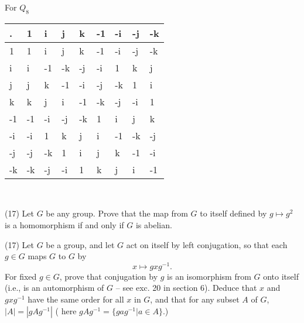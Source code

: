\documentclass[1    0pt, answers]{exam} \renewcommand{\baselinestretch}{1.05}
\theoremstyle{plain}
\theoremstyle{definition}
\begin{document}
\begin{questions}
\begin{solution}
For $Q_8$
\begin{tabular}{L||L|L|L|L|L|L|L|L||}
.  & 1  & i  & j  & k  & -1 & -i & -j & -k  \\
\hline{}  & 1  & i  & j  & k  & -1 & -i & -j & -k \\
i  & i  & -1 & -k & -j & -i & 1  & k  & j  \\
j  & j  & k  & -1 & -i & -j & -k & 1  & i  \\
k  & k  & j  & i  & -1 & -k & -j & -i & 1  \\
-1 & -1 & -i & -j & -k & 1  & i  & j  & k  \\
-i & -i & 1  & k  & j  & i  & -1 & -k & -j \\
-j & -j & -k & 1  & i  & j  & k  & -1 & -i \\
-k & -k & -j & -i & 1  & k  & j  & i  & -1 \\
\hline
\end{tabular}\\
\end{solution}

\question (17) Let $G$ be any group. Prove that the map from $G$ to itself defined by $g \mapsto g^2$ is a homomorphism if and only if $G$ is abelian.

\begin{solution}


\question (17) Let $G$ be a group, and let $G$ act on itself by left conjugation, so that each $g \in G$ maps $G$ to $G$ by $$ x \mapsto g x g^{-1}.$$
For fixed $g \in G$, prove that conjugation by $g$ is an isomorphism from $G$ onto itself (i.e., is an automorphism of $G$ -- see exc. 20 in section 6). Deduce that $x$ and $g x g^{-1}$ have the same order for all $x$ in $G$, and that for any subset $A$ of $G$, $|A| = |g A g^{-1}|$ ( here $g A g^{-1} = \{g a g^{-1} | a \in A \}$.)


\end{solution}
\end{questions}
\end{document}
